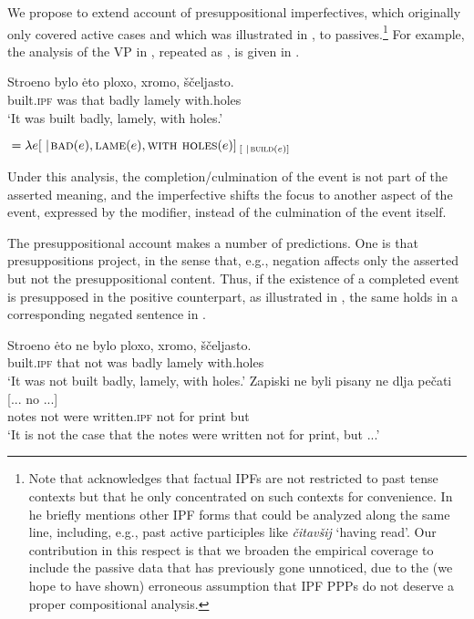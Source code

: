 \documentclass[output=paper,modfonts,newtxmath,hidelinks
]{langscibook}
\begin{document}
We propose to extend  account of presuppositional imperfectives, which originally only covered active cases and which was illustrated in , to passives.\footnote{Note that \citet{gronndiss} acknowledges that factual IPFs are not restricted to past tense contexts but that he only concentrated on such contexts for convenience. In \citet{gronn15} he briefly mentions other IPF forms that could be analyzed along the same line, including, e.g., past active participles like \textit{čitavšij} `having read'. Our contribution in this respect is that we broaden the empirical coverage to include the passive data that has previously gone unnoticed, due to the (we hope to have shown) erroneous assumption that IPF PPPs do not deserve a proper compositional analysis.} For example, the analysis of the VP in , repeated as , is given in .

\ea\gll	Stroeno bylo \.{e}to ploxo, xromo, ščeljasto.\\
	built.\textsc{ipf} was that badly lamely with.holes\\
    \glt	`It was built badly, lamely, with holes.'\label{ploxo}
    \z

\ea {}${}=\lambda e[ \hspace{0.3em}|\hspace{0.1em} \textsc{bad}(e), \textsc{lame}(e), \textsc{with holes}(e)]_{\hspace{2pt}[ \hspace{0.3em} |\hspace{0.1em}\textsc{build}(e)]}$\label{ploxoanalysis}
\z

\noindent Under this analysis, the completion/culmination of the event is not part of the asserted meaning, and the imperfective shifts the focus to another aspect of the event, expressed by the  modifier, instead of the culmination of the event itself. 

The presuppositional account makes a number of predictions. One is that presuppositions project, in the sense that, e.g., negation affects only the asserted but not the presuppositional content. Thus, if the existence of a completed event is presupposed in the positive counterpart, as illustrated in , the same holds in a corresponding negated sentence in .

\ea\label{stroenoneg}
\ea\gll 	Stroeno \.{e}to ne bylo ploxo, xromo, ščeljasto. \\
	built.\textsc{ipf} that not was badly lamely with.holes\\
 \glt   `It was not built badly, lamely, with holes.'
\ex\gll 	Zapiski ne byli pisany ne dlja pečati [... no ...]	\\
	notes not were written.\textsc{ipf} not for print          {}       but {}\\
\glt    `It is not the case that the notes were written not for print, but ...'\label{stroenonegb}
\z\z
\end{document}
